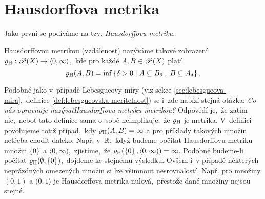 \section{Hausdorffova metrika}\label{sec:hausdorffova-metrika}

Jako první se podíváme na tzv. \emph{Hausdorffovu metriku}.
\begin{definition}\label{def:hausdorffova-metrika}
    Hausdorffovou metrikou (vzdálenost) nazýváme takové zobrazení $\varrho_\textup{H}:\mathscr{P}(X) \rightarrow \langle0,\infty\rangle$,~kde pro každé $A,B\in\mathscr{P}(X)$ platí
    \[\varrho_\textup{H}(A,B)=\inf\left\{\delta>0\;\middle|\;A\subseteq B_\delta\;,\;B\subseteq A_\delta\right\}.\]
\end{definition}
Podobně jako v~případě Lebesgueovy míry (viz sekce \ref{sec:lebesgueova-mira},~definice \ref{def:lebesgueovska-meritelnost}) se i~zde nabízí stejná otázka: \emph{Co nás opravňuje nazývat\linebreak{}Hausdorffovu metriku metrikou?} Odpovědí je,~že zatím nic,~neboť tato definice sama o~sobě neimplikuje,~že $\varrho_\textup{H}$ je metrika. V~definici povolujeme totiž případ,~kdy $\varrho_\textup{H}(A,B)=\infty$ a pro příklady takových množin netřeba chodit daleko. Např. v~$\mathbb{R}$,~když budeme počítat Hausdorffovu metriku množin $\left\{0\right\}$ a $\langle 0,\infty)$,~zjistíme,~že $\varrho_\textup{H}(\left\{0\right\},\langle 0,\infty))=\infty$. Podobně budeme-li počítat $\varrho_\textup{H}(\emptyset,\left\{0\right\})$,~dojdeme ke stejnému výsledku. Ovšem i~v případě některých neprázdných omezených množin si lze všimnout nesrovnalostí. Např. pro množiny $(0,1)$ a $(0,1\rangle$ je Hausdorffova metrika nulová,~přestože dané množiny nejsou stejné.

